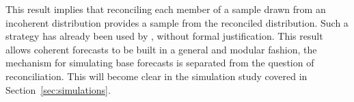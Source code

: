 \documentclass[11pt]{article}
\theoremstyle{definition}
\begin{document}
This result implies that reconciling each member of a sample drawn from an incoherent distribution provides a sample from the reconciled distribution. Such a strategy has already been used by \cite{JeoEtAl2019}, without formal justification. This result allows coherent forecasts to be built in a general and modular fashion, the mechanism for simulating base forecasts is separated from the question of reconciliation. This will become clear in the simulation study covered in Section~\ref{sec:simulations}.

\end{document}
